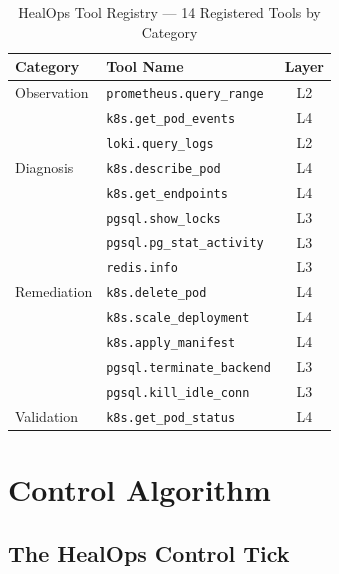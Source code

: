 \documentclass[journal,10pt,twoside]{IEEEtran}
\begin{document}
\begin{table}[!t]
\caption{HealOps Tool Registry --- 14 Registered Tools by Category}
\label{tab:tools}
\centering
\renewcommand{\arraystretch}{1.12}
{\footnotesize
\begin{tabular}{@{}llc@{}}
\toprule
\textbf{Category} & \textbf{Tool Name} & \textbf{Layer} \\
\midrule
Observation   & \texttt{prometheus.query\_range}    & L2 \\
              & \texttt{k8s.get\_pod\_events}        & L4 \\
              & \texttt{loki.query\_logs}             & L2 \\
\midrule
Diagnosis     & \texttt{k8s.describe\_pod}            & L4 \\
              & \texttt{k8s.get\_endpoints}           & L4 \\
              & \texttt{pgsql.show\_locks}            & L3 \\
              & \texttt{pgsql.pg\_stat\_activity}     & L3 \\
              & \texttt{redis.info}                   & L3 \\
\midrule
Remediation   & \texttt{k8s.delete\_pod}              & L4 \\
              & \texttt{k8s.scale\_deployment}        & L4 \\
              & \texttt{k8s.apply\_manifest}          & L4 \\
              & \texttt{pgsql.terminate\_backend}     & L3 \\
              & \texttt{pgsql.kill\_idle\_conn}       & L3 \\
\midrule
Validation    & \texttt{k8s.get\_pod\_status}         & L4 \\
\bottomrule
\end{tabular}
}
\end{table}

\section{Control Algorithm}\label{sec:algo}

\subsection{The HealOps Control Tick}
\end{document}

